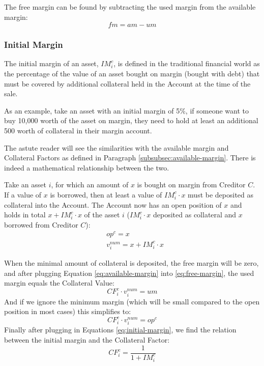 \documentclass[sigconf,nonacm]{acmart}
\begin{document}
The free margin can be found by subtracting the used margin from the available margin:
\begin{equation}
    \label{eq:free-margin}
    fm = am - um
\end{equation}

\subsubsection{Initial Margin}
\label{subsubsec:initial-margin}
The initial margin of an asset, $IM_{i}^{c}$, is defined in the traditional financial world as the percentage of the value of an asset bought on margin (bought with debt)
that must be covered by additional collateral held in the Account at the time of the sale.

As an example, take an asset with an initial margin of 5\%, if someone want to buy 10,000 worth of the asset on margin,
they need to hold at least an additional 500 worth of collateral in their margin account.

The astute reader will see the similarities with the available margin and Collateral Factors as defined in Paragraph \ref{subsubsec:available-margin}.
There is indeed a mathematical relationship between the two.

Take an asset $i$, for which an amount of $x$ is bought on margin from Creditor $C$.
If a value of $x$ is borrowed, then at least a value of $IM_{i}^{c} \cdot x$ must be deposited as collateral into the Account.
The Account now has an open position of $x$ and holds in total $x + IM_{i}^{c} \cdot x$ of the asset $i$ ($IM_{i}^{c} \cdot x$ deposited as collateral and $x$ borrowed from Creditor $C$):
\begin{equation}
    \label{eq:initial-margin}
    \begin{split}
        &op^c = x\\
        &v^{num}_i = x + IM_{i}^{c} \cdot x
    \end{split}
\end{equation}

When the minimal amount of collateral is deposited, the free margin will be zero, and after plugging Equation \ref{eq:available-margin} into \ref{eq:free-margin}, the used margin equals the Collateral Value:
\begin{equation}
    CF_{i}^{c} \cdot v^{num}_i = um
\end{equation}
And if we ignore the minimum margin (which will be small compared to the open position in most cases) this simplifies to:
\begin{equation}
    CF_{i}^{c} \cdot v^{num}_i = op^c
\end{equation}
Finally after plugging in Equations \ref{eq:initial-margin}, we find the relation between the initial margin and the Collateral Factor:
\begin{equation}
    CF_{i}^{c} = \frac{1}{1 + IM_{i}^{c}}
\end{equation}
\end{document}
